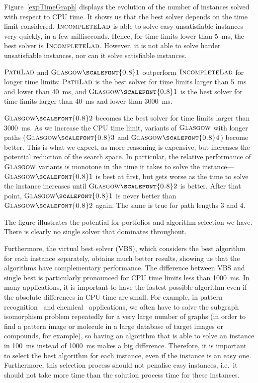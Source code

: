 \documentclass{llncs}
\newcommand{\Glasgow}{$\textsc{Glasgow}$\xspace}
\newcommand{\IncompleteLAD}{$\textsc{IncompleteLad}$\xspace}
\newcommand{\PathLAD}{$\textsc{PathLad}$\xspace}
\newcommand{\GlasgowOne}{$\textsc{Glasgow{\scalefont{0.8}1}}$\xspace}
\newcommand{\GlasgowTwo}{$\textsc{Glasgow{\scalefont{0.8}2}}$\xspace}
\newcommand{\GlasgowThree}{$\textsc{Glasgow{\scalefont{0.8}3}}$\xspace}
\newcommand{\GlasgowFour}{$\textsc{Glasgow{\scalefont{0.8}4}}$\xspace}
\begin{document}
Figure~\ref{expTimeGraph} displays the evolution of the number of instances solved with respect to
CPU time. It shows us that the best solver depends on the time limit considered. \IncompleteLAD is
able to solve easy unsatisfiable instances very quickly, in a few milliseconds. Hence, for time
limits lower than \SI{5}{\ms}, the best solver is \IncompleteLAD. However, it is not able to solve harder
unsatisfiable instances, nor can it solve satisfiable instances.

\PathLAD and \GlasgowOne outperform \IncompleteLAD for longer time limits: \PathLAD is the
best solver for time limits larger than \SI{5}{\ms} and lower than \SI{40}{\ms}, and \GlasgowOne is the best solver
for time limits larger than \SI{40}{\ms} and lower than \SI{3000}{\ms}.

\GlasgowTwo becomes the best solver for time limits larger than \SI{3000}{\ms}.
As we
increase the CPU time limit, variants of \Glasgow with longer paths (\GlasgowThree and \GlasgowFour)
become better. This is what we expect, as more reasoning is expensive, but
increases the potential
reduction of the search space. In particular, the relative performance of \Glasgow variants is
monotone in the time it takes to solve the instance---\GlasgowOne is best at first, but gets worse as
the time to solve the instance increases until \GlasgowTwo is better. After that point, \GlasgowOne is
never better than \GlasgowTwo again. The same is true for path lengths 3 and 4.

The figure illustrates the potential for portfolios and algorithm selection we have. There is
clearly no single solver that dominates throughout.

Furthermore, the virtual best solver (VBS), which considers the best algorithm
for each instance separately, obtains much better results, showing us that the
algorithms have complementary performance. The difference between VBS and single
best is particularly pronounced for CPU time limits less than \SI{1000}{\ms}. In
many applications, it is important to have the fastest possible algorithm even
if the absolute differences in CPU time are small. For example, in pattern
recognition~\cite{pr15,cviu11} and chemical~\cite{Giugno:2013} applications, we
often have to solve the subgraph isomorphism problem repeatedly for a very large
number of graphs (in order to find a pattern image or molecule in a large
database of target images or compounds, for example), so having an algorithm
that is able to solve an instance in \SI{100}{\ms} instead of \SI{1000}{\ms}
makes a big difference.  Therefore, it is important to select the best algorithm
for each instance, even if the instance is an easy one. Furthermore, this
selection process should not penalise easy instances, i.e.\ it should not take more time than
the solution process time for these instances.
\end{document}
